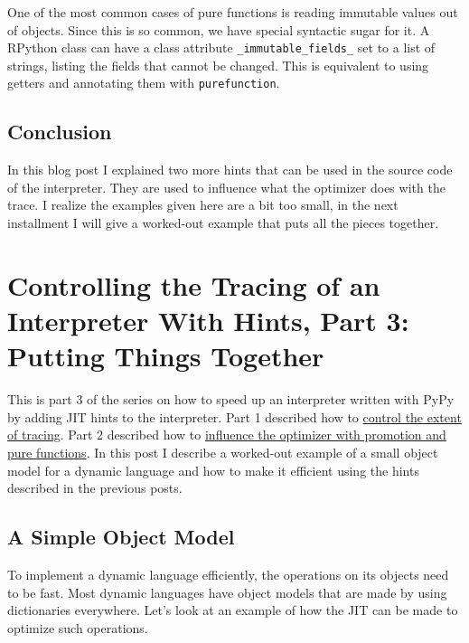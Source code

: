 \documentclass{sig-alternate}
\begin{document}
One of the most common cases of pure functions is reading immutable
values out of objects. Since this is so common, we have special syntactic sugar
for it. A RPython class can have a class attribute \texttt{\_immutable\_fields\_} set to
a list of strings, listing the fields that cannot be changed. This is equivalent
to using getters and annotating them with \texttt{purefunction}.



\subsection{Conclusion}

In this blog post I explained two more hints that can be used in the source code
of the interpreter. They are used to influence what the optimizer does with the
trace. I realize the examples given here are a bit too small, in the next
installment I will give a worked-out example that puts all the pieces together.

\section{Controlling the Tracing of an Interpreter With Hints, Part 3: Putting Things Together}

This is part 3 of the series on how to speed up an interpreter written with
PyPy by adding JIT hints to the interpreter. Part 1 described how to \href{http://morepypy.blogspot.com/2011/03/controlling-tracing-of-interpreter-with.html}{control
the extent of tracing}. Part 2 described how to \href{http://morepypy.blogspot.com/2011/03/controlling-tracing-of-interpreter-with_15.html}{influence the optimizer with
promotion and pure functions}. In this post I describe a worked-out example of
a small object model for a dynamic language and how to make it efficient using
the hints described in the previous posts.



\subsection{A Simple Object Model}

To implement a dynamic language efficiently, the operations on its objects need
to be fast. Most dynamic languages have object models that are made by using
dictionaries everywhere. Let's look at an example of how the JIT can be made to
optimize such operations.
\end{document}
